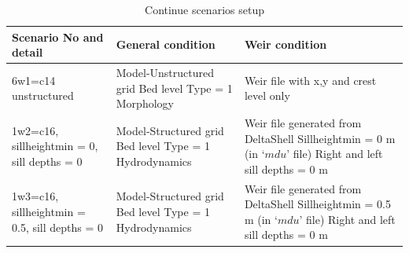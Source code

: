 \begin {table} [H]
\begin{center}
\begin{tabular} { |p{5cm} | p{5cm} |p{5cm} | }
		 
			\end{tabular}
		\end{center}
	\end{table} 
		 
		 
		 
	\begin {table} [H]
	\caption { Continue scenarios setup} \label{tab:title2}
	\begin{center}
		\begin{tabular} { |p{5cm} | p{5cm} |p{5cm} | }
			\hline
			{\bf Scenario No and detail} & {\bf General condition} & {\bf Weir condition} \\ \hline	 
		 
		 6w1=c14 unstructured & Model-Unstructured grid
		 	Bed level Type = 1
		 	Morphology
		 	& Weir file with x,y and crest level only \\ 		\hline
		1w2=c16, sillheightmin = 0, sill depths = 0  & Model-Structured grid
		Bed level Type = 1
		Hydrodynamics
		 & Weir file generated from DeltaShell
		 Sillheightmin  = 0 m (in $‘mdu’$ file)
		 Right and left sill depths = 0 m
		  \\ 		\hline
		1w3=c16, sillheightmin = 0.5, sill depths = 0 & Model-Structured grid
		Bed level Type = 1
		Hydrodynamics
		 & Weir file generated from DeltaShell
		 Sillheightmin  = 0.5 m (in $‘mdu’$ file)
		 Right and left sill depths = 0 m
		 

\end{tabular}
\end{center}
\end{table}
